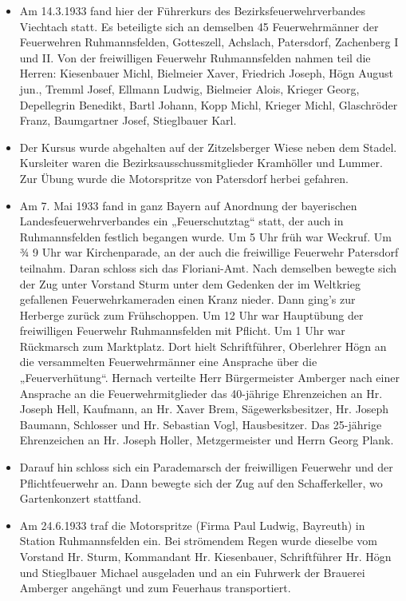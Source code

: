 \documentclass[12pt,a4paper]{book}
\begin{document}
\begin{itemize}
\item Am 14.3.1933 fand hier der Führerkurs des Bezirksfeuerwehrverbandes
Viechtach statt. Es beteiligte sich an demselben 45 Feuerwehrmänner der
Feuerwehren Ruhmannsfelden, Gotteszell, Achslach, Patersdorf, Zachenberg I und
II. Von der freiwilligen Feuerwehr Ruhmannsfelden nahmen teil die Herren:
Kiesenbauer Michl, Bielmeier Xaver, Friedrich Joseph, Högn August jun., Tremml
Josef, Ellmann Ludwig, Bielmeier Alois, Krieger Georg, Depellegrin Benedikt,
Bartl Johann, Kopp Michl, Krieger Michl, Glaschröder Franz, Baumgartner Josef,
Stieglbauer Karl.

\item Der Kursus wurde abgehalten auf der Zitzelsberger Wiese neben dem Stadel.
Kursleiter waren die Bezirksausschussmitglieder Kramhöller und Lummer. Zur Übung
wurde die Motorspritze von Patersdorf herbei gefahren.

\item Am 7. Mai 1933 fand in ganz Bayern auf Anordnung der bayerischen
Landesfeuerwehrverbandes ein „Feuerschutztag“ statt, der auch in Ruhmannsfelden
festlich begangen wurde. Um 5 Uhr früh war Weckruf. Um ¾ 9 Uhr war
Kirchenparade, an der auch die freiwillige Feuerwehr Patersdorf teilnahm. Daran
schloss sich das Floriani-Amt. Nach demselben bewegte sich der Zug unter
Vorstand Sturm unter dem Gedenken der im Weltkrieg gefallenen Feuerwehrkameraden
einen Kranz nieder. Dann ging’s zur Herberge zurück zum Frühschoppen. Um 12 Uhr
war Hauptübung der freiwilligen Feuerwehr Ruhmannsfelden mit Pflicht. Um 1 Uhr
war Rückmarsch zum Marktplatz. Dort hielt Schriftführer, Oberlehrer Högn an die
versammelten Feuerwehrmänner eine Ansprache über die „Feuerverhütung“. Hernach
verteilte Herr Bürgermeister Amberger nach einer Ansprache an die
Feuerwehrmitglieder das 40-jährige Ehrenzeichen an Hr. Joseph Hell, Kaufmann, an
Hr. Xaver Brem, Sägewerksbesitzer, Hr. Joseph Baumann, Schlosser und Hr.
Sebastian Vogl, Hausbesitzer. Das 25-jährige Ehrenzeichen an Hr. Joseph Holler,
Metzgermeister und Herrn Georg Plank.

\item Darauf hin schloss sich ein Parademarsch der freiwilligen Feuerwehr und
der Pflichtfeuerwehr an. Dann bewegte sich der Zug auf den Schafferkeller, wo
Gartenkonzert stattfand.

\item Am 24.6.1933 traf die Motorspritze (Firma Paul Ludwig, Bayreuth) in
Station Ruhmannsfelden ein. Bei strömendem Regen wurde dieselbe vom Vorstand Hr.
Sturm, Kommandant Hr. Kiesenbauer, Schriftführer Hr. Högn und Stieglbauer
Michael ausgeladen und an ein Fuhrwerk der Brauerei Amberger angehängt und zum
Feuerhaus transportiert.


\end{itemize}
\end{document}
